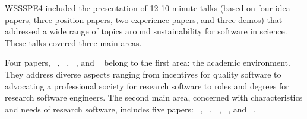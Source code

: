 \documentclass[11pt, oneside]{amsart}
\newcommand{\note}[1]{ {\textcolor{blueish}    { ***Note:      #1 }}}
\begin{document}


WSSSPE4 included the presentation of 12 10-minute talks (based on four idea papers, three position papers,
two experience papers, and three demos) that addressed a wide range of topics around
sustainability for software in science. These talks covered three main areas.

Four papers, 
~\cite{Heroux:2016ws}, 
~\cite{GAllen:2016ws}, 
~\cite{Philippe:2016ws}, and 
~\cite{Gwilliams:2016ws} belong to the first area: the academic environment.
They address diverse aspects ranging from incentives for quality software to
advocating a professional society for research software to roles and degrees for
research software engineers.
The second main area, concerned with characteristics and needs of
research software, includes five papers:
~\cite{Dubey1:2016ws},  ~\cite{ChueHong:2016ws},
~\cite{Dubey2:2016ws}, ~\cite{Queiroz:2016ws}, and ~\cite{Childers:2016ws}.
\end{document}
